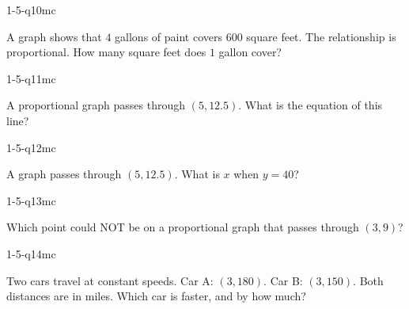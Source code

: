 \begin{practiceQuestion}{1-5-q10}{mc}
\begin{questionText}
A graph shows that $4$ gallons of paint covers $600$ square feet. The relationship is proportional. How many square feet does $1$ gallon cover?
\end{questionText}
\end{practiceQuestion}

\begin{practiceQuestion}{1-5-q11}{mc}
\begin{questionText}
A proportional graph passes through $(5, 12.5)$. What is the equation of this line?
\end{questionText}
\end{practiceQuestion}

\begin{practiceQuestion}{1-5-q12}{mc}
\begin{questionText}
A graph passes through $(5, 12.5)$. What is $x$ when $y = 40$?
\end{questionText}
\end{practiceQuestion}

\begin{practiceQuestion}{1-5-q13}{mc}
\begin{questionText}
Which point could NOT be on a proportional graph that passes through $(3, 9)$?
\end{questionText}
\end{practiceQuestion}

\begin{practiceQuestion}{1-5-q14}{mc}
\begin{questionText}
Two cars travel at constant speeds. Car A: $(3, 180)$. Car B: $(3, 150)$. Both distances are in miles. Which car is faster, and by how much?
\end{questionText}
\end{practiceQuestion}

